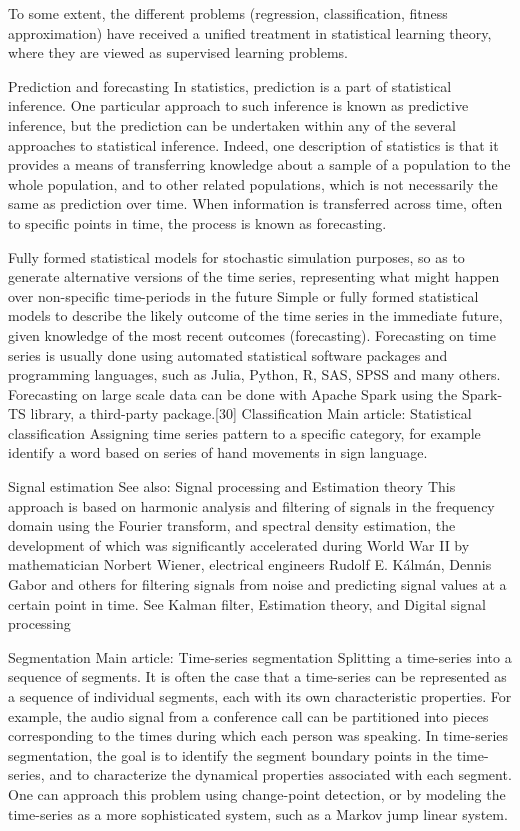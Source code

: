 To some extent, the different problems (regression, classification, fitness approximation) have received a unified treatment in statistical learning theory, where they are viewed as supervised learning problems.

Prediction and forecasting
In statistics, prediction is a part of statistical inference. One particular approach to such inference is known as predictive inference, but the prediction can be undertaken within any of the several approaches to statistical inference. Indeed, one description of statistics is that it provides a means of transferring knowledge about a sample of a population to the whole population, and to other related populations, which is not necessarily the same as prediction over time. When information is transferred across time, often to specific points in time, the process is known as forecasting.

Fully formed statistical models for stochastic simulation purposes, so as to generate alternative versions of the time series, representing what might happen over non-specific time-periods in the future
Simple or fully formed statistical models to describe the likely outcome of the time series in the immediate future, given knowledge of the most recent outcomes (forecasting).
Forecasting on time series is usually done using automated statistical software packages and programming languages, such as Julia, Python, R, SAS, SPSS and many others.
Forecasting on large scale data can be done with Apache Spark using the Spark-TS library, a third-party package.[30]
Classification
Main article: Statistical classification
Assigning time series pattern to a specific category, for example identify a word based on series of hand movements in sign language.

Signal estimation
See also: Signal processing and Estimation theory
This approach is based on harmonic analysis and filtering of signals in the frequency domain using the Fourier transform, and spectral density estimation, the development of which was significantly accelerated during World War II by mathematician Norbert Wiener, electrical engineers Rudolf E. Kálmán, Dennis Gabor and others for filtering signals from noise and predicting signal values at a certain point in time. See Kalman filter, Estimation theory, and Digital signal processing

Segmentation
Main article: Time-series segmentation
Splitting a time-series into a sequence of segments. It is often the case that a time-series can be represented as a sequence of individual segments, each with its own characteristic properties. For example, the audio signal from a conference call can be partitioned into pieces corresponding to the times during which each person was speaking. In time-series segmentation, the goal is to identify the segment boundary points in the time-series, and to characterize the dynamical properties associated with each segment. One can approach this problem using change-point detection, or by modeling the time-series as a more sophisticated system, such as a Markov jump linear system.

